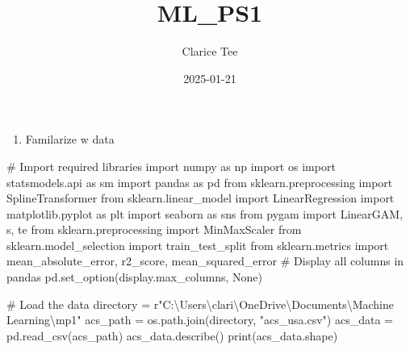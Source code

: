 \documentclass[
  11pt,
  letterpaper,
  DIV=11,
  numbers=noendperiod]{scrartcl}
\title{ML\_PS1}
\author{Clarice Tee}
\date{2025-01-21}
\newenvironment{Shaded}{\begin{snugshade}}{\end{snugshade}}
\newcommand{\BuiltInTok}[1]{\textcolor[rgb]{0.00,0.23,0.31}{#1}}
\newcommand{\CommentTok}[1]{\textcolor[rgb]{0.37,0.37,0.37}{#1}}
\newcommand{\ImportTok}[1]{\textcolor[rgb]{0.00,0.46,0.62}{#1}}
\newcommand{\NormalTok}[1]{\textcolor[rgb]{0.00,0.23,0.31}{#1}}
\newcommand{\OperatorTok}[1]{\textcolor[rgb]{0.37,0.37,0.37}{#1}}
\newcommand{\StringTok}[1]{\textcolor[rgb]{0.13,0.47,0.30}{#1}}
\newcommand{\VariableTok}[1]{\textcolor[rgb]{0.07,0.07,0.07}{#1}}
\newcommand{\VerbatimStringTok}[1]{\textcolor[rgb]{0.13,0.47,0.30}{#1}}
\providecommand{\tightlist}{%
  \setlength{\itemsep}{0pt}\setlength{\parskip}{0pt}}\usepackage{longtable,booktabs,array}
\renewcommand*\contentsname{Table of contents}
\newcommand\contentsname{Table of contents}
\begin{document}
\maketitle


\renewcommand*\contentsname{Table of contents}
{
\hypersetup{linkcolor=}
\setcounter{tocdepth}{3}
\tableofcontents
}

\begin{enumerate}
\def\labelenumi{\arabic{enumi}.}
\tightlist
\item
  Familarize w data
\end{enumerate}

\begin{Shaded}
\begin{Highlighting}[]
\CommentTok{\# Import required libraries}
\ImportTok{import}\NormalTok{ numpy }\ImportTok{as}\NormalTok{ np}
\ImportTok{import}\NormalTok{ os}
\ImportTok{import}\NormalTok{ statsmodels.api }\ImportTok{as}\NormalTok{ sm}
\ImportTok{import}\NormalTok{ pandas }\ImportTok{as}\NormalTok{ pd}
\ImportTok{from}\NormalTok{ sklearn.preprocessing }\ImportTok{import}\NormalTok{ SplineTransformer}
\ImportTok{from}\NormalTok{ sklearn.linear\_model }\ImportTok{import}\NormalTok{ LinearRegression}
\ImportTok{import}\NormalTok{ matplotlib.pyplot }\ImportTok{as}\NormalTok{ plt}
\ImportTok{import}\NormalTok{ seaborn }\ImportTok{as}\NormalTok{ sns}
\ImportTok{from}\NormalTok{ pygam }\ImportTok{import}\NormalTok{ LinearGAM, s, te}
\ImportTok{from}\NormalTok{ sklearn.preprocessing }\ImportTok{import}\NormalTok{ MinMaxScaler}
\ImportTok{from}\NormalTok{ sklearn.model\_selection }\ImportTok{import}\NormalTok{ train\_test\_split}
\ImportTok{from}\NormalTok{ sklearn.metrics }\ImportTok{import}\NormalTok{ mean\_absolute\_error, r2\_score, mean\_squared\_error}
\CommentTok{\# Display all columns in pandas}
\NormalTok{pd.set\_option(}\StringTok{\textquotesingle{}display.max\_columns\textquotesingle{}}\NormalTok{, }\VariableTok{None}\NormalTok{)}
\end{Highlighting}
\end{Shaded}

\begin{Shaded}
\begin{Highlighting}[]
\CommentTok{\# Load the data}
\NormalTok{directory }\OperatorTok{=} \VerbatimStringTok{r"C:\textbackslash{}Users\textbackslash{}clari\textbackslash{}OneDrive\textbackslash{}Documents\textbackslash{}Machine Learning\textbackslash{}mp1"}
\NormalTok{acs\_path }\OperatorTok{=}\NormalTok{ os.path.join(directory, }\StringTok{"acs\_usa.csv"}\NormalTok{)}
\NormalTok{acs\_data }\OperatorTok{=}\NormalTok{ pd.read\_csv(acs\_path)}
\NormalTok{acs\_data.describe()}
\BuiltInTok{print}\NormalTok{(acs\_data.shape)}
\end{Highlighting}
\end{Shaded}
\end{document}
